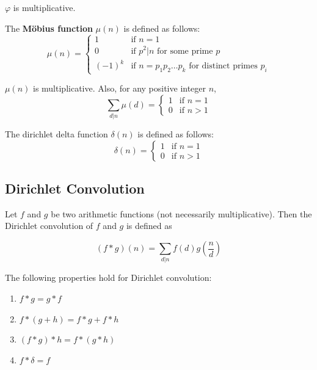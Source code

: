 \begin{lemma}
    $\varphi$ is multiplicative.
\end{lemma}

\begin{definition}
    The \textbf{Möbius function} $\mu(n)$ is defined as follows:   
    \[
        \mu(n) = 
        \begin{cases}
            1 & \text{if } n=1\\
            0 & \text{if } p^2|n \text{ for some prime } p\\
            (-1)^k & \text{if } n=p_1p_2\dots p_k \text{ for distinct primes } p_i
        \end{cases}
    \]
\end{definition}    

\begin{theorem}
   $\mu(n)$ is multiplicative. Also, for any positive integer $n$,
   \[\sum_{d|n} \mu(d) = \begin{cases} 1 & \text{if } n=1 \\ 0 & \text{if } n>1 \end{cases}\]
\end{theorem}

\begin{definition}
    The dirichlet delta function $\delta(n)$ is defined as follows:
    \[\delta(n) = \begin{cases} 1 & \text{if } n=1 \\ 0 & \text{if } n>1 \end{cases}\] 
\end{definition}

    \subsection{Dirichlet Convolution}
        \begin{definition}
            Let $f$ and $g$ be two arithmetic functions (not necessarily multiplicative). Then the Dirichlet convolution of $f$ and $g$ is defined as

            \[(f * g)(n) = \sum_{d|n} f(d)g\left(\frac{n}{d}\right)\]
        \end{definition}

        \begin{theorem}
            The following properties hold for Dirichlet convolution:
            \begin{enumerate}
                \item $f * g = g * f$

                \item $f * (g + h) = f * g + f * h$
                
                \item $(f * g) * h = f * (g * h)$
                
                \item $f * \delta = f$
            \end{enumerate}
        \end{theorem}


